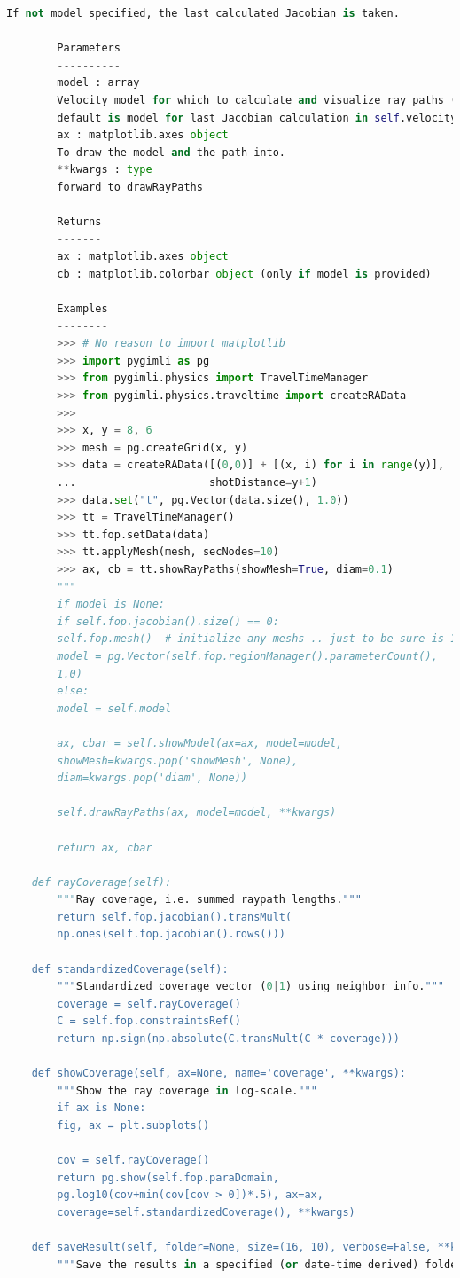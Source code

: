 \documentclass[a4paper, 12 pt]{article} %
\begin{document}
\begin{lstlisting}[language=Python, caption=Código-fonte para pygimli.physics.traveltime.TravelTimeManager]
		If not model specified, the last calculated Jacobian is taken.
		
		Parameters
		----------
		model : array
		Velocity model for which to calculate and visualize ray paths (the
		default is model for last Jacobian calculation in self.velocity).
		ax : matplotlib.axes object
		To draw the model and the path into.
		**kwargs : type
		forward to drawRayPaths
		
		Returns
		-------
		ax : matplotlib.axes object
		cb : matplotlib.colorbar object (only if model is provided)
		
		Examples
		--------
		>>> # No reason to import matplotlib
		>>> import pygimli as pg
		>>> from pygimli.physics import TravelTimeManager
		>>> from pygimli.physics.traveltime import createRAData
		>>>
		>>> x, y = 8, 6
		>>> mesh = pg.createGrid(x, y)
		>>> data = createRAData([(0,0)] + [(x, i) for i in range(y)],
		...                     shotDistance=y+1)
		>>> data.set("t", pg.Vector(data.size(), 1.0))
		>>> tt = TravelTimeManager()
		>>> tt.fop.setData(data)
		>>> tt.applyMesh(mesh, secNodes=10)
		>>> ax, cb = tt.showRayPaths(showMesh=True, diam=0.1)
		"""
		if model is None:
		if self.fop.jacobian().size() == 0:
		self.fop.mesh()  # initialize any meshs .. just to be sure is 1
		model = pg.Vector(self.fop.regionManager().parameterCount(),
		1.0)
		else:
		model = self.model
		
		ax, cbar = self.showModel(ax=ax, model=model,
		showMesh=kwargs.pop('showMesh', None),
		diam=kwargs.pop('diam', None))
		
		self.drawRayPaths(ax, model=model, **kwargs)
		
		return ax, cbar
	
	def rayCoverage(self):
		"""Ray coverage, i.e. summed raypath lengths."""
		return self.fop.jacobian().transMult(
		np.ones(self.fop.jacobian().rows()))
	
	def standardizedCoverage(self):
		"""Standardized coverage vector (0|1) using neighbor info."""
		coverage = self.rayCoverage()
		C = self.fop.constraintsRef()
		return np.sign(np.absolute(C.transMult(C * coverage)))
	
	def showCoverage(self, ax=None, name='coverage', **kwargs):
		"""Show the ray coverage in log-scale."""
		if ax is None:
		fig, ax = plt.subplots()
		
		cov = self.rayCoverage()
		return pg.show(self.fop.paraDomain,
		pg.log10(cov+min(cov[cov > 0])*.5), ax=ax,
		coverage=self.standardizedCoverage(), **kwargs)
	
	def saveResult(self, folder=None, size=(16, 10), verbose=False, **kwargs):
		"""Save the results in a specified (or date-time derived) folder.
		

\end{lstlisting}
\end{document}
